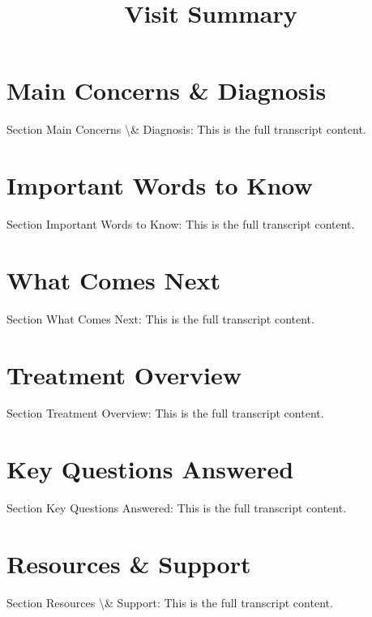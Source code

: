 \documentclass[12pt]{article}
\begin{document}
\title{\textbf{Visit Summary}}
\date{}
\maketitle


\section*{Main Concerns & Diagnosis}
Section Main Concerns \textbackslash{}& Diagnosis: This is the full transcript content.

\section*{Important Words to Know}
Section Important Words to Know: This is the full transcript content.

\section*{What Comes Next}
Section What Comes Next: This is the full transcript content.

\section*{Treatment Overview}
Section Treatment Overview: This is the full transcript content.

\section*{Key Questions Answered}
Section Key Questions Answered: This is the full transcript content.

\section*{Resources & Support}
Section Resources \textbackslash{}& Support: This is the full transcript content.
\end{document}
